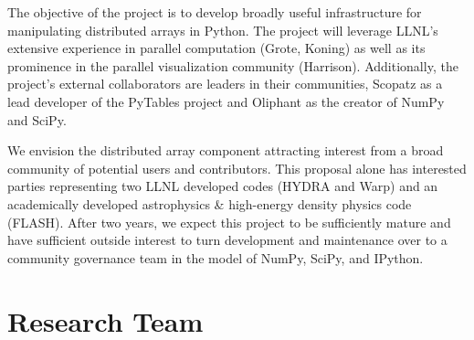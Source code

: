 \documentclass[letterpaper,11pt]{article}
\begin{document}
The objective of the project is to develop broadly useful infrastructure for manipulating 
distributed arrays in Python.  The project will leverage LLNL's extensive experience in 
parallel computation (Grote, Koning) as well as its prominence in the parallel visualization 
community (Harrison).  Additionally, the project's external collaborators are leaders in their 
communities, Scopatz as a lead developer of the PyTables project and Oliphant as the creator of 
NumPy and SciPy.

We envision the distributed array component attracting interest from a broad community 
of potential users and contributors.  This proposal alone has interested parties 
representing two LLNL developed codes (HYDRA and Warp) and an academically developed 
astrophysics \& high-energy density physics code (FLASH).  After two years, we expect this 
project to be sufficiently mature and have sufficient outside interest to turn development 
and maintenance over to a community governance team in the model of NumPy, SciPy, and IPython.


\section*{Research Team}
\end{document}
